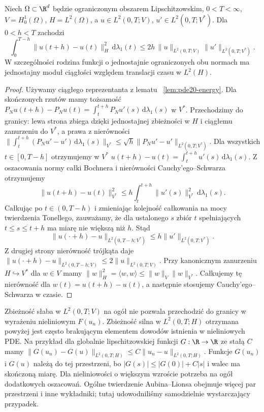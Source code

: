 \begin{wniosek}
\label{cor:pde20-translations}
Niech $\Omega\subset\R^d$ będzie ograniczonym obszarem
Lipschitzowskim, $0<T<\infty$,
$V=H_0^1(\Omega)$, $H=L^2(\Omega)$,
a $u\in L^2(0,T;V)$, $u'\in L^2(0,T;V^*)$.
Dla $0<h<T$ zachodzi
\[
 \int_0^{T-h}\|u(t+h)-u(t)\|_H^2\,\mathrm d\lambda_1(t)
 \le 2h\,\|u\|_{L^2(0,T;V)}
 \|u'\|_{L^2(0,T;V^*)}.
\]
W szczególności rodzina funkcji o jednostajnie
ograniczonych obu normach ma jednostajny moduł ciągłości
względem translacji czasu w $L^2(H)$.
\end{wniosek}
\begin{proof}
Używamy ciągłego reprezentanta z lematu
~\ref{lem:pde20-energy}. Dla skończonych rzutów
mamy tożsamość
$P_Nu(t+h)-P_Nu(t)=\int_t^{t+h}P_Nu'(s)
\,\mathrm d\lambda_1(s)$ w $V^*$.
Przechodzimy do granicy: lewa strona zbiega dzięki
jednostajnej zbieżności w $H$ i ciągłemu zanurzeniu
do $V^*$, a prawa z nierówności
$\|\int_t^{t+h}(P_Nu'-u')\,\mathrm d\lambda_1(s)\|_{V^*}
\le\sqrt h\|P_Nu'-u'\|_{L^2(0,T;V^*)}$.
Dla wszystkich $t\in[0,T-h]$ otrzymujemy w $V^*$
$u(t+h)-u(t)=\int_t^{t+h}u'(s)\,\mathrm d\lambda_1(s)$.
Z oszacowania normy całki Bochnera i nierówności
Cauchy'ego--Schwarza otrzymujemy
\[
 \|u(t+h)-u(t)\|_{V^*}^2
 \le h\int_t^{t+h}\|u'(s)\|_{V^*}^2\,\mathrm d\lambda_1(s).
\]
Całkując po $t\in(0,T-h)$ i zmieniając kolejność
całkowania na mocy twierdzenia Tonellego, zauważamy,
że dla ustalonego $s$ zbiór $t$ spełniających
$t\le s\le t+h$ ma miarę nie większą niż $h$.
Stąd
\[
 \|u(\cdot+h)-u\|_{L^2(0,T-h;V^*)}
 \le h\|u'\|_{L^2(0,T;V^*)}.
\]
Z drugiej strony nierówność trójkąta daje
$\|u(\cdot+h)-u\|_{L^2(0,T-h;V)}
\le2\|u\|_{L^2(0,T;V)}$.
Przy kanonicznym zanurzeniu $H\hookrightarrow V^*$
dla $w\in V$ mamy $\|w\|_H^2=\langle w,w\rangle
\le\|w\|_V\|w\|_{V^*}$.
Całkujemy tę nierówność dla $w(t)=u(t+h)-u(t)$,
a następnie stosujemy Cauchy'ego--Schwarza w czasie.
\end{proof}

\begin{uwaga}
Zbieżność słaba w $L^2(0,T;V)$ na ogół nie pozwala
przechodzić do granicy w wyrażeniu nieliniowym $F(u_n)$.
Zbieżność silna w $L^2(0,T;H)$ otrzymana powyżej
jest często brakującym elementem dowodów istnienia
w nieliniowych PDE. Na przykład dla globalnie
lipschitzowskiej funkcji $G:\R\to\R$ ze stałą $C$
mamy
$\|G(u_n)-G(u)\|_{L^2(0,T;H)}
\le C\|u_n-u\|_{L^2(0,T;H)}$.
Funkcje $G(u_n)$ i $G(u)$ należą do tej przestrzeni,
bo $|G(s)|\le |G(0)|+C|s|$ i walec ma skończoną
miarę. Dla nieliniowości o większym wzroście
potrzeba na ogół dodatkowych oszacowań. Ogólne twierdzenie Aubina--Lionsa
obejmuje więcej par przestrzeni i inne wykładniki;
tutaj udowodniliśmy samodzielnie wystarczający przypadek.
\end{uwaga}

